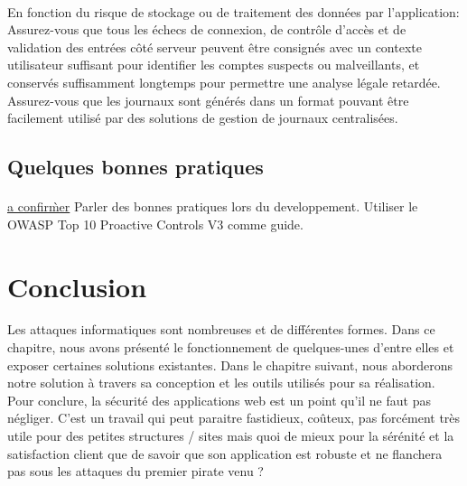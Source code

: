 \begin{enumerate}
	\paragraph{}
	En fonction du risque de stockage ou de traitement des données par l'application:
	Assurez-vous que tous les échecs de connexion, de contrôle d'accès et de validation des entrées côté serveur peuvent être consignés avec un contexte utilisateur suffisant pour identifier les comptes suspects ou malveillants, et conservés suffisamment longtemps pour permettre une analyse légale retardée.
	Assurez-vous que les journaux sont générés dans un format pouvant être facilement utilisé par des solutions de gestion de journaux centralisées.	
      \end{enumerate}

      \subsection{Quelques bonnes pratiques}
      \paragraph{}
	\underline{a confir\`mer}
	Parler des bonnes pratiques lors du developpement. Utiliser le OWASP Top 10 Proactive Controls V3 comme guide. 
    
    
  \section*{Conclusion}
    Les attaques informatiques sont nombreuses et de différentes formes. Dans ce chapitre, nous avons présenté le fonctionnement de quelques-unes d'entre elles et exposer certaines solutions existantes. Dans le chapitre suivant, nous aborderons notre solution à travers sa conception et les outils utilisés pour sa réalisation.
    \\Pour conclure, la sécurité des applications web est un point qu’il ne faut pas négliger. C’est un travail qui peut paraitre fastidieux, coûteux, pas forcément très utile pour des petites structures / sites mais quoi de mieux pour la sérénité et la satisfaction client que de savoir que son application est robuste et ne flanchera pas sous les attaques du premier pirate venu ?